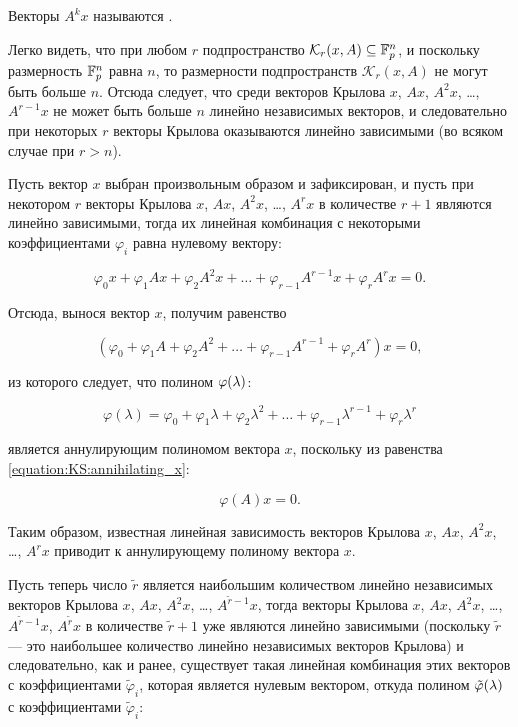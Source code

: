 \begin{definition}
	Векторы $A^k x$ называются .
\end{definition}

Легко видеть, что при любом $r$ подпространство $\mathcal K_r(x,A) \subseteq \mathbb{F}^{n}_p$, и поскольку размерность $\mathbb{F}^{n}_p$ равна $n$,
то размерности подпространств $\mathcal K_r(x,A)$ не могут быть больше $n$. Отсюда следует, что среди векторов Крылова
$x$, $Ax$, $A^2x$, \dots, $A^{r-1}x$ не может быть больше $n$ линейно независимых векторов, и следовательно при некоторых $r$ векторы Крылова
оказываются линейно зависимыми (во всяком случае при $r > n$).

Пусть вектор $x$ выбран произвольным образом и зафиксирован, и пусть при некотором $r$ векторы Крылова $x$, $Ax$, $A^2x$, \dots, $A^rx$
в количестве $r+1$ являются линейно зависимыми, тогда их линейная комбинация с некоторыми коэффициентами $\varphi_i$ равна нулевому вектору:

	$$ \varphi_0 x + \varphi_1 Ax + \varphi_2 A^2x + \dots + \varphi_{r-1} A^{r-1}x + \varphi_r A^rx = 0. $$

Отсюда, вынося вектор $x$, получим равенство

	\begin{equation} \label{equation:KS:annihilating_x}
		\left ( \varphi_0  + \varphi_1 A + \varphi_2 A^2 + \dots + \varphi_{r-1} A^{r-1} + \varphi_r A^r \right ) x = 0,
	\end{equation}

из которого следует, что полином $\varphi (\lambda)$:

	$$ \varphi ( \lambda ) = \varphi_0  + \varphi_1 \lambda + \varphi_2 \lambda^2 + \dots + \varphi_{r-1} \lambda^{r-1} + \varphi_r \lambda^r $$

является аннулирующим полиномом вектора $x$, поскольку из равенства \eqref{equation:KS:annihilating_x}:

	$$ \varphi ( A ) x = 0. $$

Таким образом, известная линейная зависимость векторов Крылова $x$, $Ax$, $A^2x$, \dots, $A^rx$ приводит к аннулирующему полиному вектора $x$.

Пусть теперь число $\tilde r$ является наибольшим количеством линейно независимых векторов Крылова $x$, $Ax$, $A^2x$, \dots, $A^{\tilde r-1}x$,
тогда векторы Крылова $x$, $Ax$, $A^2x$, \dots, $A^{\tilde r-1}x$, $A^{\tilde r}x$ в количестве $\tilde r + 1$ уже являются линейно
зависимыми (поскольку $\tilde r$ --- это наибольшее количество линейно независимых векторов Крылова) и следовательно, как и ранее, существует
такая линейная комбинация этих векторов с коэффициентами $\tilde \varphi_i$, которая является нулевым вектором, откуда полином
$\tilde \varphi (\lambda)$ с коэффициентами $\tilde \varphi_i$:


